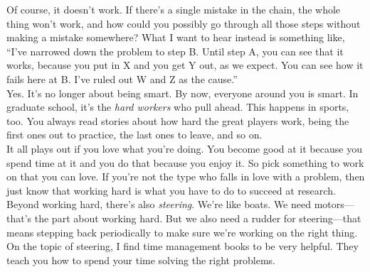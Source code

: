 Of course, it doesn't work.  If there's a single mistake in the    chain, the whole thing won't work, and how could you possibly go  through all those steps without making a mistake somewhere?  What I want to   hear instead is something like, ``I've narrowed down the problem to   step B.  Until step A, you can see that it works, because you put in
X  and you get Y out, as we expect.   You can see how it fails here
at   B.  I've ruled out W and Z as the cause.'' \\

  Yes.  It's no longer about being  smart.  By now, everyone around you is smart.  In graduate school,   it's the {\em  hard workers} who  pull ahead.  This happens  in sports, too.  You always read stories about how hard the great players work, being the first ones out to practice, the last ones to
leave, and so on.  \\



  It all plays out if you love what you're doing.
You become good at it because you spend time at it and you do that because you enjoy it.
So pick something to work on that you can love.   If
you're not the type who falls in love with a problem, then just know   that working hard is what you have to do to succeed at research. \\

  Beyond
working hard, there's also {\em steering}.  We're like boats.  We need
motors---that's the part about working hard.  But we also need a rudder for
steering---that means stepping back periodically to make sure
we're working on the right thing.  On the topic of steering,
I find time management books to be very helpful.  They teach you how  to spend your time solving the right problems. \\

